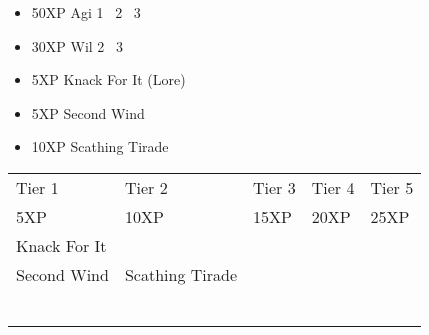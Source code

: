\documentclass{article}
\begin{document}


\begin{multicols}{2}
\setlength{\columnseprule}{0.3pt}
\begin{itemize}[noitemsep]
\item 50XP Agi 1 \faArrowRight\ 2 \faArrowRight\ 3
\item 30XP Wil 2 \faArrowRight\ 3
\item 5XP Knack For It (Lore)
\item 5XP Second Wind
\item 10XP Scathing Tirade
\end{itemize}
\end{multicols}


\vspace*{\fill}

\hfill{}


\pagebreak


\noindent\begin{tabu} to 
\rowfont{\bfseries\sffamily\centering} Tier 1 & Tier 2 & Tier 3 & Tier 4 & Tier 5\\
\rowfont{\small\sffamily\centering} 5XP & 10XP & 15XP & 20XP & 25XP\\
Knack For It\\
Second Wind & Scathing Tirade \\
 &  & \\
 &  & & \\
 &  & & & \\
 &  & & & \\
 &  & & & \\
 &  & & & \\

\end{tabu}
\end{document}
